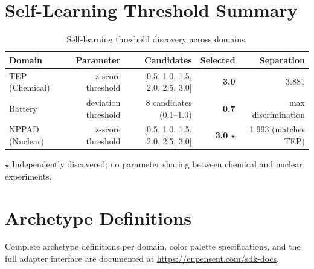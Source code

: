 \documentclass[12pt,a4paper]{article}
\begin{document}
\appendix
\section{Self-Learning Threshold Summary}

\begin{table}[H]
\centering
\caption{Self-learning threshold discovery across domains.}
\begin{tabular}{lrrrr}
\toprule
\textbf{Domain} & \textbf{Parameter} & \textbf{Candidates} & \textbf{Selected} & \textbf{Separation} \\
\midrule
TEP (Chemical)   & z-score threshold & [0.5, 1.0, 1.5, 2.0, 2.5, 3.0] & \textbf{3.0} & 3.881 \\
Battery          & deviation threshold & 8 candidates (0.1--1.0)         & \textbf{0.7} & max discrimination \\
NPPAD (Nuclear)  & z-score threshold & [0.5, 1.0, 1.5, 2.0, 2.5, 3.0] & \textbf{3.0 $\star$} & 1.993 (matches TEP) \\
\bottomrule
\end{tabular}
\end{table}

$\star$ Independently discovered; no parameter sharing between chemical and nuclear experiments.

\section{Archetype Definitions}
Complete archetype definitions per domain, color palette specifications, and the full adapter
interface are documented at \url{https://enpensent.com/sdk-docs}.
\end{document}
